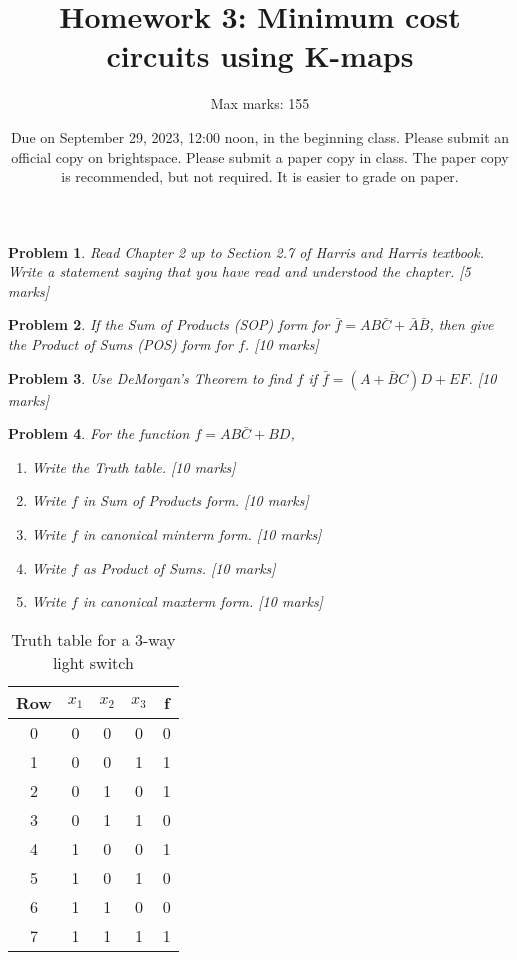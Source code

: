 \documentclass[twocolumn]{article}
\title{Homework 3: Minimum cost circuits using K-maps}
\author{Max marks: 155}
\date{Due on September 29, 2023, 12:00 noon, in the beginning class. Please
submit an official copy on brightspace. Please submit a paper copy in class.
The paper copy is recommended, but not required. It is easier to grade on
paper. }
\newtheorem{prob}{Problem}
\newcommand{\bA}{\bar{A}}
\newcommand{\bB}{\bar{B}}
\newcommand{\bC}{\bar{C}}
\begin{document}
\maketitle

\begin{prob}
  Read Chapter 2 up to Section 2.7 of Harris and Harris textbook. Write a statement saying that you have read and understood the chapter. [5 marks]
\end{prob}

\begin{prob}
If the Sum of Products (SOP) form for $ \bar{f} = AB\bC+\bA\bB$, then give the Product of Sums (POS) form for
$f$. [10 marks]
\end{prob}

\begin{prob}
Use DeMorgan's Theorem to find $f$  if  $\bar{f} = (A + \bB C)D + EF$. [10 marks]
\end{prob}


\begin{prob}
  For the function $f = AB\bC + BD$,
  \begin{enumerate}
    \item Write the Truth table. [10 marks]
    \item Write $f$ in Sum of Products form. [10 marks]
    \item Write $f$ in canonical minterm form. [10 marks]
    \item Write $f$ as Product of Sums. [10 marks]
    \item Write $f$ in canonical maxterm form. [10 marks]
  \end{enumerate}
\end{prob}

\begin{table}
  \centering
  \begin{tabular}{c|ccc||c}
    \toprule
    Row & $x_1$ & $x_2$ & $x_3$ & f \\
    \midrule
    0 & 0 & 0 & 0 & 0 \\
    1 & 0 & 0 & 1 & 1 \\
    2 & 0 & 1 & 0 & 1 \\
    3 & 0 & 1 & 1 & 0 \\
    4 & 1 & 0 & 0 & 1 \\
    5 & 1 & 0 & 1 & 0 \\
    6 & 1 & 1 & 0 & 0 \\
    7 & 1 & 1 & 1 & 1 \\
    \bottomrule
    \end{tabular}
    \caption{Truth table for a 3-way light switch}
    \label{tab:3-way-light-switch}
\end{table}
\end{document}

